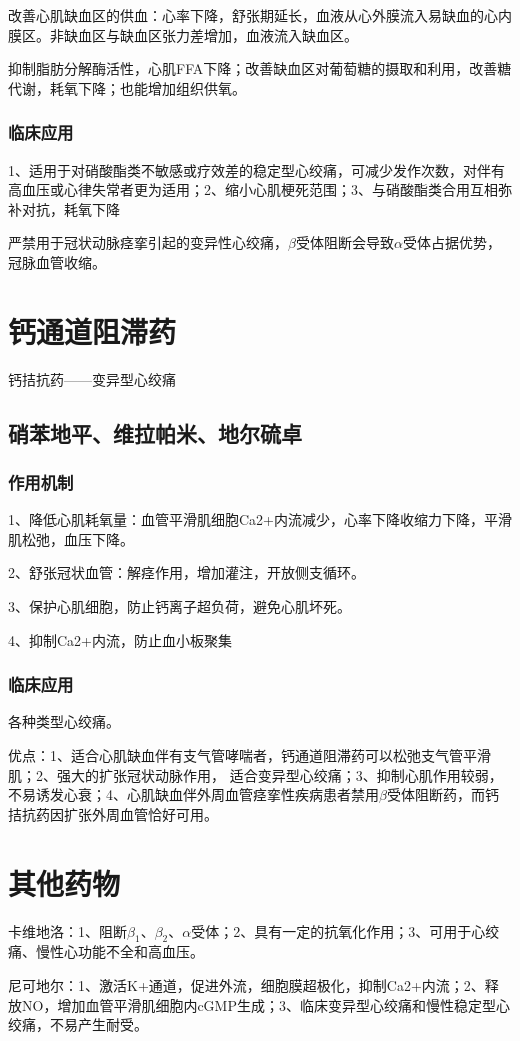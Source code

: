 \documentclass[UTF8]{ctexbook}
\begin{document}
改善心肌缺血区的供血：心率下降，舒张期延长，血液从心外膜流入易缺血的心内膜区。非缺血区与缺血区张力差增加，血液流入缺血区。

抑制脂肪分解酶活性，心肌FFA下降；改善缺血区对葡萄糖的摄取和利用，改善糖代谢，耗氧下降；也能增加组织供氧。
\subsubsection{临床应用}
1、适用于对硝酸酯类不敏感或疗效差的稳定型心绞痛，可减少发作次数，对伴有高血压或心律失常者更为适用；2、缩小心肌梗死范围；3、与硝酸酯类合用互相弥补对抗，耗氧下降

严禁用于冠状动脉痉挛引起的变异性心绞痛，\(\beta\)受体阻断会导致\(\alpha\)受体占据优势，冠脉血管收缩。
\section{钙通道阻滞药}
钙拮抗药——变异型心绞痛
\subsection{硝苯地平、维拉帕米、地尔硫卓}
\subsubsection{作用机制}
1、降低心肌耗氧量：血管平滑肌细胞Ca2+内流减少，心率下降收缩力下降，平滑肌松弛，血压下降。

2、舒张冠状血管：解痉作用，增加灌注，开放侧支循环。

3、保护心肌细胞，防止钙离子超负荷，避免心肌坏死。

4、抑制Ca2+内流，防止血小板聚集
\subsubsection{临床应用}
各种类型心绞痛。

优点：1、适合心肌缺血伴有支气管哮喘者，钙通道阻滞药可以松弛支气管平滑肌；2、强大的扩张冠状动脉作用， 适合变异型心绞痛；3、抑制心肌作用较弱，不易诱发心衰；4、心肌缺血伴外周血管痉挛性疾病患者禁用\(\beta\)受体阻断药，而钙拮抗药因扩张外周血管恰好可用。
\section{其他药物}
卡维地洛：1、阻断\(\beta_{1}\)、\(\beta_{2}\)、\(\alpha\)受体；2、具有一定的抗氧化作用；3、可用于心绞痛、慢性心功能不全和高血压。

尼可地尔：1、激活K+通道，促进外流，细胞膜超极化，抑制Ca2+内流；2、释放NO，增加血管平滑肌细胞内cGMP生成；3、临床变异型心绞痛和慢性稳定型心绞痛，不易产生耐受。
\end{document}
